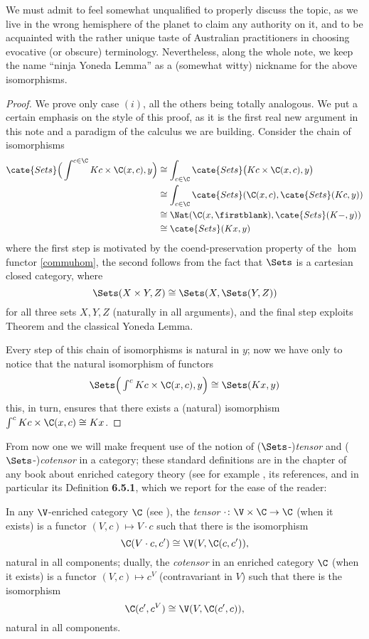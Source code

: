 We must admit to feel somewhat unqualified to properly discuss the topic, as we live in the wrong hemisphere of the planet to claim any authority on it, and to be acquainted with the rather unique taste of Australian practitioners in choosing evocative (or obscure) terminology. Nevertheless, along the whole note, we keep the name ``ninja Yoneda Lemma'' as a (somewhat witty) nickname for the above isomorphisms.
\begin{proof}
We prove only case $(i)$, all the others being totally analogous. We put a certain emphasis on the style of this proof, as it is the first real new argument in this note and a paradigm of the calculus we are building. Consider the chain of isomorphisms
\begin{align*}
\cate{Sets}\Big(\displaystyle \int^{c\in\C} Kc\times \C(x,c),y\Big)&\cong \int_{c\in\C} \cate{Sets}\big( Kc\times \C(x,c),y \big)\\
&\cong \int_{c\in\C}\cate{Sets}(\C(x,c),\cate{Sets}(Kc,y))\\
&\cong \Nat(\C(x,\firstblank),\cate{Sets}(K-,y))\\
&\cong\cate{Sets}(Kx,y)
\end{align*}
where the first step is motivated by the coend-preservation property of the $\hom$ functor \ref{commuhom}, the second follows from the fact that $\Sets$ is a cartesian closed category, where 
\[
\Sets(X\times Y, Z)\cong \Sets(X, \Sets(Y,Z))
\]
for all three sets $X,Y,Z$ (naturally in all arguments), and the final step exploits Theorem  and the classical Yoneda Lemma.

Every step of this chain of isomorphisms is natural in $y$; now we have only to notice that the natural isomorphism of functors
\[
\Sets\Big(\textstyle \int^c Kc\times \C(x,c),y\Big)\cong \Sets(Kx,y)
\]
this, in turn, ensures that there exists a (natural) isomorphism $\int^c Kc\times \C(x,c)\cong Kx$.%
\end{proof}
From now one we will make frequent use of the notion of ($\Sets$-)\emph{tensor} and ($\Sets$-)\emph{cotensor} in a category; these standard definitions are in the chapter of any book about enriched category theory (see for example \cite[Ch. \textbf{6}]{Bor2}, its references, and in particular its Definition \textbf{6.5.1}, which we report for the ease of the reader:
\begin{definition}\label{tenscotens}
In any $\V$-enriched category $\C$ (see \cite[Def\@. \textbf{6.2.1}]{Bor2}), the \emph{tensor} $\cdot\colon \V\times \C\to \C$ (when it exists) is a functor $(V, c)\mapsto V\cdot c$ such that there is the isomorphism \[ \label{ten} \C(V\cdot c, c')\cong \V(V, \C(c,c')),\] natural in all components; dually, the \emph{cotensor} in an enriched category $\C$ (when it exists) is a functor $(V, c)\mapsto c^V$ (contravariant in $V$) such that there is the isomorphism \[ \label{coten} \C(c', c^V)\cong \V(V, \C(c',c)),\] natural in all components. 
\end{definition}
